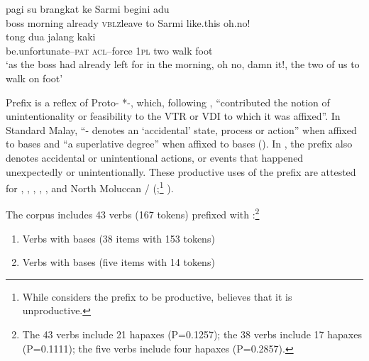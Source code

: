 \ea
\label{Example_3.1}
 {pagi} {{su}} {{brangkat}} {{ke}} {{Sarmi}} {{begini}} {adu}\\ %
 boss  morning  {already}  {\textsc{vblz}leave}  {to}  {Sarmi}  {like.this}  oh.no!\\
  {}  {tong}  {dua}  {jalang}  {kaki}\\
 {be.unfortunate–\textsc{pat}}  {\textsc{acl}–force}  {\textsc{1pl}}  {two}  {walk}  {foot}\\
\glt 
‘as the boss had already left for  in the morning, oh no, damn it!, the two of us   to walk on foot’ \textstyleExampleSource{[080921-002-Cv.0001]}\\
\z


Prefix  is a reflex of Proto- *-, which, following \citet[155]{Adelaar.1992}, “contributed the notion of unintentionality or feasibility to the VTR or VDI to which it was affixed”. In Standard Malay, “- denotes an ‘accidental’ state, process or action” when affixed to  bases and “a superlative degree” when affixed to  bases (\citeyear*[150–151]{Adelaar.1992}). In , the prefix also denotes accidental or unintentional actions, or events that happened unexpectedly or unintentionally. These productive uses of the prefix are attested for  \citep[98]{vanMinde.1997},  {\citep[250]{Paauw.2009}},  {\citep[46]{Steinhauer.1983}},  {\citep[256]{Paauw.2009}},  \citep[22]{Stoel.2005}, and North Moluccan /  (\citealt[18]{Taylor.1983};\footnote{While \citet[18]{Taylor.1983} considers the prefix to be productive, \citet[4]{Voorhoeve.1983} believes that it is unproductive.} \citealt[133]{Litamahuputty.2012}).



The corpus includes 43  verbs (167 tokens) prefixed with :\footnote{The 43 verbs include 21 hapaxes (P=0.1257); the 38  verbs include 17 hapaxes (P=0.1111); the five  verbs include four hapaxes (P=0.2857).}



\begin{enumerate}
\item 
Verbs with  bases (38 items with 153 tokens)

\item 
Verbs with  bases (five items with 14 tokens)

\end{enumerate}

